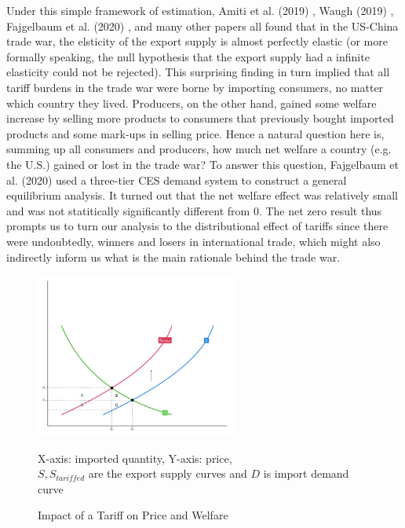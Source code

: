 \documentclass[12pt]{article}
\begin{document}
Under this simple framework of estimation, Amiti et al. (2019) \cite{amiti2019impact}, Waugh (2019) \cite{waugh2019consumption}, Fajgelbaum et al. (2020) \cite{fajgelbaum2020return}, 
and many other papers all found that in the US-China trade war, the elsticity of the export supply is almost perfectly elastic 
(or more formally speaking, the null hypothesis that the export supply had a infinite elasticity could not be rejected). 
This surprising finding in turn implied that all tariff burdens in the trade war were borne by importing consumers, no matter which country they lived. 
Producers, on the other hand, gained some welfare increase by selling more products to consumers that previously bought imported products and some mark-ups in selling price.
Hence a natural question here is, summing up all consumers and producers, how much net welfare a country (e.g. the U.S.) gained or lost in the trade war?
To answer this question, Fajgelbaum et al. (2020) \cite{fajgelbaum2020return} used a three-tier CES demand system to construct a general equilibrium analysis. 
It turned out that the net welfare effect was relatively small and was not statitically significantly different from 0. 
The net zero result thus prompts us to turn our analysis to the distributional effect of tariffs since there were undoubtedly, winners and losers in international trade, 
which might also indirectly inform us what is the main rationale behind the trade war.

\begin{figure}[H]
    \centering
    \includegraphics[width = 0.6\textwidth]{tariff_welfare.png}
    \caption{Impact of a Tariff on Price and Welfare}
    {\footnotesize X-axis: imported quantity, Y-axis: price, \\ 
    $S, S_{tariffed}$ are the export supply curves and $D$ is import demand curve \par}
    \label{tariff_welfare}
\end{figure}
\end{document}
